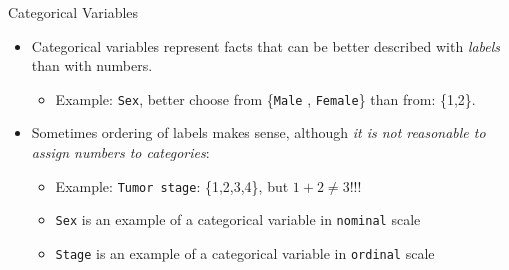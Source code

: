 \documentclass[
  ignorenonframetext,
]{beamer}
\providecommand{\tightlist}{%
  \setlength{\itemsep}{0pt}\setlength{\parskip}{0pt}}
\begin{document}
\begin{frame}[fragile]{Categorical Variables}
\protect\hypertarget{categorical-variables}{}
\begin{itemize}
\item
  Categorical variables represent facts that can be better described
  with \emph{labels} than with numbers.

  \begin{itemize}
  \tightlist
  \item
    Example: \texttt{Sex}, better choose from \{\texttt{Male} ,
    \texttt{Female}\} than from: \{1,2\}.
  \end{itemize}
\item
  Sometimes ordering of labels makes sense, although \emph{it is not
  reasonable to assign numbers to categories}:

  \begin{itemize}
  \item
    Example: \texttt{Tumor\ stage}: \{1,2,3,4\}, but \(1+2\neq 3\)!!!
  \item
    \texttt{Sex} is an example of a categorical variable in
    \texttt{nominal} scale
  \item
    \texttt{Stage} is an example of a categorical variable in
    \texttt{ordinal} scale
  \end{itemize}
\end{itemize}
\end{frame}
\end{document}
